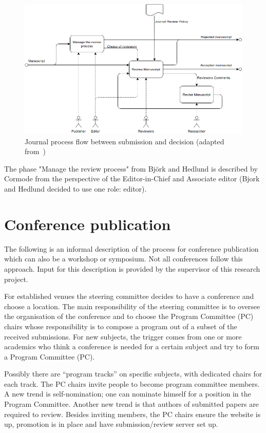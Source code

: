 \documentclass{ou-report}
\begin{document}
\begin{figure}[H]
\centering
\includegraphics[width=\textwidth]{images/bh2004_dia_a22331_part.drawio.png}
\caption{Journal process flow between submission and decision (adapted
from~\cite[diagram A22331]{BH2004})}
\label{fig:bh2004_a22331}
\end{figure}
The phase "Manage the review process" from Bj\"ork and Hedlund is described by 
Cormode from the perspective of the Editor-in-Chief and Associate editor (Bjork 
and Hedlund decided to use one role: editor). 

\section{Conference publication}
The following is an informal description of the process for conference 
publication which can also be a workshop or symposium. Not all conferences 
follow this approach. Input for this description is provided by the supervisor
of this research project.

For established venues the steering committee decides to have a conference and 
choose a location. The main responsibility of the steering committee is to 
oversee the organisation of the conference and to choose the Program 
Committee (PC) chairs whose responsibility is to compose a program out of a 
subset of the received submissions. For new subjects, the trigger comes from one
or more academics who think a conference is needed for a certain subject and
try to form a Program Committee (PC). 

Possibly there are ``program tracks'' on specific subjects, with dedicated
chairs for each track.
The PC chairs invite people to become program 
committee members. A new trend is self-nomination; one can nominate himself for 
a position in the Program Committee. Another new trend is that authors of 
submitted papers are required to review.
Besides inviting members, the PC chairs ensure the website is up, promotion 
is in place and have submission/review server set up.
\end{document}

